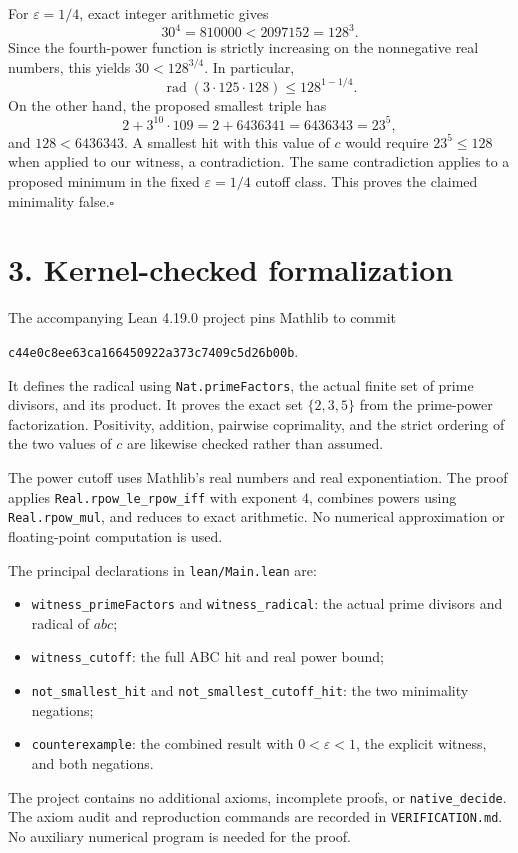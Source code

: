 \documentclass[11pt,a4paper]{article}
\newcommand{\rad}{\operatorname{rad}}
\begin{document}
\newpage
For $\varepsilon=1/4$, exact integer arithmetic gives
\[
  30^4=810000<2097152=128^3.
\]
Since the fourth-power function is strictly increasing on the nonnegative
real numbers, this yields $30<128^{3/4}$. In particular,
\[
  \rad(3\cdot125\cdot128)\leq128^{1-1/4}.
\]
On the other hand, the proposed smallest triple has
\[
  2+3^{10}\cdot109=2+6436341=6436343=23^5,
\]
and $128<6436343$. A smallest hit with this value of $c$ would require
$23^5\leq128$ when applied to our witness, a contradiction.
The same contradiction applies to a proposed minimum in the fixed
$\varepsilon=1/4$ cutoff class.
This proves the claimed minimality false.\hfill$\square$

\section*{3. Kernel-checked formalization}
The accompanying Lean 4.19.0 project pins Mathlib to commit
\begin{center}\small\texttt{c44e0c8ee63ca166450922a373c7409c5d26b00b}.\end{center}
It defines the radical using \texttt{Nat.primeFactors}, the actual finite
set of prime divisors, and its product. It proves the exact set
$\{2,3,5\}$ from the prime-power factorization. Positivity, addition, pairwise
coprimality, and the strict ordering of the two values of $c$ are likewise
checked rather than assumed.

The power cutoff uses Mathlib's real numbers and real exponentiation.
The proof applies \texttt{Real.rpow\_le\_rpow\_iff} with exponent $4$,
combines powers using \texttt{Real.rpow\_mul}, and reduces to exact
arithmetic. No numerical approximation or floating-point computation is
used.

The principal declarations in \texttt{lean/Main.lean} are:
\begin{itemize}
\item \texttt{witness\_primeFactors} and \texttt{witness\_radical}:
the actual prime divisors and radical of $abc$;
\item \texttt{witness\_cutoff}: the full ABC hit and real power bound;
\item \texttt{not\_smallest\_hit} and
\texttt{not\_smallest\_cutoff\_hit}: the two minimality negations;
\item \texttt{counterexample}: the combined result with
$0<\varepsilon<1$, the explicit witness, and both negations.
\end{itemize}
The project contains no additional axioms, incomplete proofs, or
\texttt{native\_decide}. The axiom audit and reproduction commands are
recorded in \texttt{VERIFICATION.md}. No auxiliary numerical program is
needed for the proof.
\end{document}
